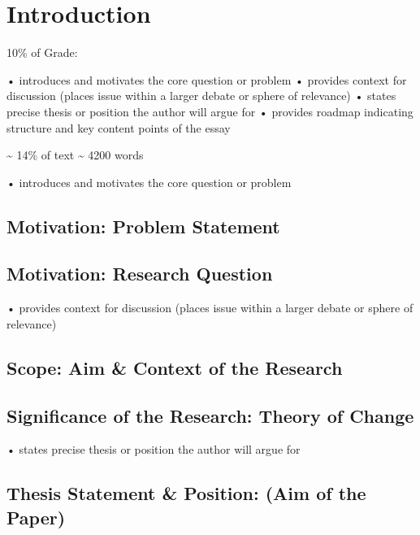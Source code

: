 \documentclass[12pt,a4paper]{book}      %
\begin{document}
\chapter{}\label{section-1}

\chapter{Introduction}\label{introduction}

10\% of Grade:

• introduces and motivates the core question or problem • provides
context for discussion (places issue within a larger debate or sphere of
relevance) • states precise thesis or position the author will argue for
• provides roadmap indicating structure and key content points of the
essay

\textasciitilde{} 14\% of text \textasciitilde{} 4200 words

• introduces and motivates the core question or problem

\section{Motivation: Problem
Statement}\label{motivation-problem-statement}

\section{Motivation: Research
Question}\label{motivation-research-question}

• provides context for discussion (places issue within a larger debate
or sphere of relevance)

\section{Scope: Aim \& Context of the
Research}\label{scope-aim-context-of-the-research}

\section{Significance of the Research: Theory of
Change}\label{significance-of-the-research-theory-of-change}

• states precise thesis or position the author will argue for

\section{Thesis Statement \& Position: (Aim of the
Paper)}\label{thesis-statement-position-aim-of-the-paper}
\end{document}
